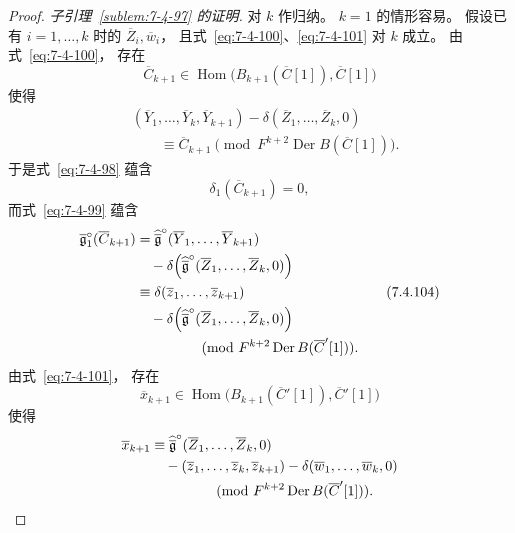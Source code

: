 \begin{proof}
\par\noindent\textit{子引理~\ref{sublem:7-4-97} 的证明.}\quad
对 $k$ 作归纳。
$k=1$ 的情形容易。
假设已有 $i=1,\ldots,k$ 时的
$\overline Z_i,\overline w_i$，
且式~\eqref{eq:7-4-100}、\eqref{eq:7-4-101}
对 $k$ 成立。
由式~\eqref{eq:7-4-100}，
存在
\[
\overline C_{k+1}\in
\operatorname{Hom}\bigl(
B_{k+1}(\overline C[1]),
\overline C[1]
\bigr)
\]
使得
\begin{equation}
\begin{aligned}
&(\overline Y_1,\ldots,\overline Y_k,\overline Y_{k+1})
-\delta(\overline Z_1,\ldots,\overline Z_k,0)\\
&\qquad\equiv
\overline C_{k+1}
\pmod{F^{k+2}\operatorname{Der}B(\overline C[1])}.
\end{aligned}
\tag{7.4.102}\label{eq:7-4-102}
\end{equation}
于是式~\eqref{eq:7-4-98} 蕴含
\begin{equation}
\delta_1(\overline C_{k+1})=0,
\tag{7.4.103}\label{eq:7-4-103}
\end{equation}
而式~\eqref{eq:7-4-99} 蕴含
\begin{equation}
\begin{aligned}
\overline{\mathfrak g}^{\circ}_1(\overline C_{k+1})
&=
\widehat{\overline{\mathfrak g}}^{\circ}
(\overline Y_1,\ldots,\overline Y_{k+1})\\
&\quad-
\delta\Bigl(
\widehat{\overline{\mathfrak g}}^{\circ}
(\overline Z_1,\ldots,\overline Z_k,0)
\Bigr)\\
&\equiv
\delta(\overline z_1,\ldots,\overline z_{k+1})\\
&\quad-
\delta\Bigl(
\widehat{\overline{\mathfrak g}}^{\circ}
(\overline Z_1,\ldots,\overline Z_k,0)
\Bigr)\\
&\hspace{15mm}
\pmod{F^{k+2}\operatorname{Der}B(\overline C'[1])}.
\end{aligned}
\tag{7.4.104}\label{eq:7-4-104}
\end{equation}
由式~\eqref{eq:7-4-101}，
存在
\[
\overline x_{k+1}\in
\operatorname{Hom}\bigl(
B_{k+1}(\overline C'[1]),
\overline C'[1]
\bigr)
\]
使得
\[
\begin{aligned}
\overline x_{k+1}
&\equiv
\widehat{\overline{\mathfrak g}}^{\circ}
(\overline Z_1,\ldots,\overline Z_k,0)\\
&\quad-
(\overline z_1,\ldots,\overline z_k,\overline z_{k+1})
-\delta(\overline w_1,\ldots,\overline w_k,0)\\
&\hspace{15mm}
\pmod{F^{k+2}\operatorname{Der}B(\overline C'[1])}.

\end{aligned}\]
\end{proof}
